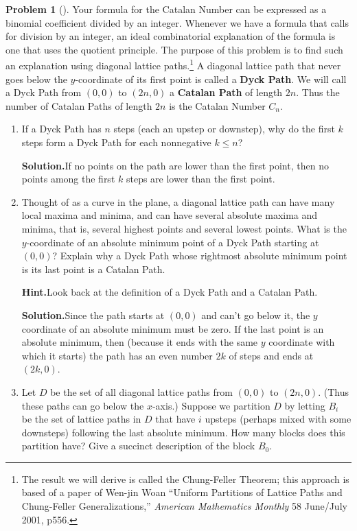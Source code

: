 \documentclass[10pt,]{book}
\newcommand{\terminology}[1]{\textbf{#1}}
\theoremstyle{plain}
\theoremstyle{definition}
\newtheorem{activity}[project]{Problem}
\theoremstyle{definition}
\numberwithin{equation}{chapter}
\begin{document}
\begin{activity}[]\label{activity-52}
Your formula for the Catalan Number can be expressed as a binomial coefficient divided by an integer. Whenever we have a formula that calls for division by an integer, an ideal combinatorial explanation of the formula is one that uses the quotient principle. The purpose of this problem is to find such an explanation using diagonal lattice paths.\footnote{The result we will derive is called the Chung-Feller Theorem; this approach is based of a paper of Wen-jin Woan ``Uniform Partitions of Lattice Paths and Chung-Feller Generalizations,'' \textsl{American Mathematics Monthly} 58 June/July 2001, p556.\label{fn-3}} A diagonal lattice path that never goes below the \(y\)-coordinate of its first point is called a \terminology{Dyck Path}. We will call a Dyck Path from \((0,0)\) to \((2n,0)\) a \terminology{Catalan Path} of length \(2n\). Thus the number of Catalan Paths of length \(2n\) is the Catalan Number \(C_n\).%
\begin{enumerate}[font=\bfseries,label=(\alph*),ref=\alph*]
\item\label{task-55} If a Dyck Path has \(n\) steps (each an upstep or downstep), why do the first \(k\) steps form a Dyck Path for each nonnegative \(k\le n\)?%
\par\medskip\noindent%
\textbf{Solution.}\quad If no points on the path are lower than the first point, then no points among the first \(k\) steps are lower than the first point.%
\item\label{task-56} Thought of as a curve in the plane, a diagonal lattice path can have many local maxima and minima, and can have several absolute maxima and minima, that is, several highest points and several lowest points. What is the \(y\)-coordinate of an absolute minimum point of a Dyck Path starting at \((0,0)\)?  Explain why a Dyck Path whose rightmost absolute minimum point is its last point is a Catalan Path.%
\par\medskip\noindent%
\textbf{Hint.}\quad Look back at the definition of a Dyck Path and a Catalan Path.%
\par\medskip\noindent%
\textbf{Solution.}\quad Since the path starts at \((0,0)\) and can't go below it, the \(y\) coordinate of an absolute minimum must be zero. If the last point is an absolute minimum, then (because it ends with the same \(y\) coordinate with which it starts) the path has an even number \(2k\) of steps and ends at \((2k,0)\).%
\item\label{task-57} Let \(D\) be the set of all diagonal lattice paths from \((0,0)\) to \((2n,0)\).  (Thus these paths can go below the \(x\)-axis.) Suppose we partition \(D\) by letting \(B_i\) be the set of lattice paths in \(D\) that have \(i\) upsteps (perhaps mixed with some downsteps) following the last absolute minimum.  How many blocks does this partition have?  Give a succinct description of the block \(B_0\).%

\end{enumerate}
\end{activity}
\end{document}
